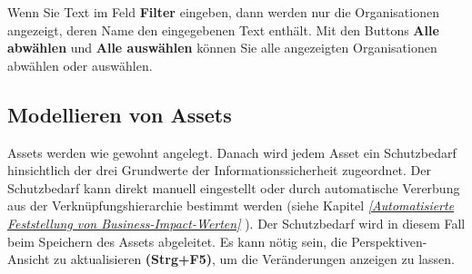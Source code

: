 \documentclass[a4paper,10pt]{book}
\begin{document}
Wenn Sie Text im Feld \textbf {Filter} eingeben, dann werden nur die Organisationen angezeigt, deren Name den eingegebenen Text enthält. Mit den Buttons \textbf {Alle abwählen} und \textbf {Alle auswählen} können Sie alle angezeigten Organisationen abwählen oder auswählen.

\subsection{Modellieren von Assets}
Assets werden wie gewohnt angelegt. Danach wird jedem Asset ein Schutzbedarf hinsichtlich der drei Grundwerte der
Informationssicherheit zugeordnet. Der Schutzbedarf kann direkt manuell eingestellt oder durch automatische
Vererbung aus der Verknüpfungshierarchie bestimmt werden (siehe Kapitel {\em \ref{Automatisierte Feststellung von Business-Impact-Werten} }).
Der Schutzbedarf wird in diesem Fall beim Speichern des Assets abgeleitet. Es kann nötig sein, die Perspektiven-Ansicht zu aktualisieren \textbf{(Strg+F5)},
um die Veränderungen anzeigen zu lassen.
\end{document}
